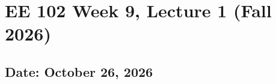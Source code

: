 \documentclass{ee102_notes}
\renewcommand{\releasedate}{October 26, 2026}
\begin{document}
\section*{EE 102 Week 9, Lecture 1 (Fall 2026)}
\subsection*{Date: \releasedate}
\tableofcontents

\end{document}
